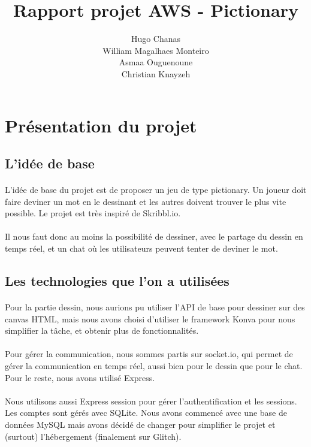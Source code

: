 \documentclass[11pt,a4paper]{article}
\date{}
\title{Rapport projet AWS - Pictionary}
\author{ Hugo Chanas \\ William Magalhaes Monteiro \\ Asmaa Ouguenoune \\ Christian Knayzeh }
\begin{document}
    \maketitle
    \section{Présentation du projet}
        \subsection{L'idée de base}
            \paragraph{}
            L'idée de base du projet est de proposer un jeu de type pictionary.
            Un joueur doit faire deviner un mot en le dessinant et les autres doivent trouver le plus vite possible.
            Le projet est très inspiré de Skribbl.io.
            \paragraph{}
            Il nous faut donc au moins la possibilité de dessiner, avec le partage du dessin en temps réel,
            et un chat où les utilisateurs peuvent tenter de deviner le mot.
        \subsection{Les technologies que l'on a utilisées}
            \paragraph{}
            Pour la partie dessin, nous aurions pu utiliser l'API de base pour dessiner sur des canvas HTML,
            mais nous avons choisi d'utiliser le framework Konva pour nous simplifier la tâche, et obtenir plus de fonctionnalités.
            \paragraph{}
            Pour gérer la communication, nous sommes partis sur socket.io, qui permet de gérer la communication en temps réel,
            aussi bien pour le dessin que pour le chat. Pour le reste, nous avons utilisé Express.
            \paragraph{}
            Nous utilisons aussi Express session pour gérer l'authentification et les sessions.
            Les comptes sont gérés avec SQLite.
            Nous avons commencé avec une base de données MySQL mais avons décidé de changer pour simplifier le projet et (surtout) l'hébergement (finalement sur Glitch).
\end{document}
